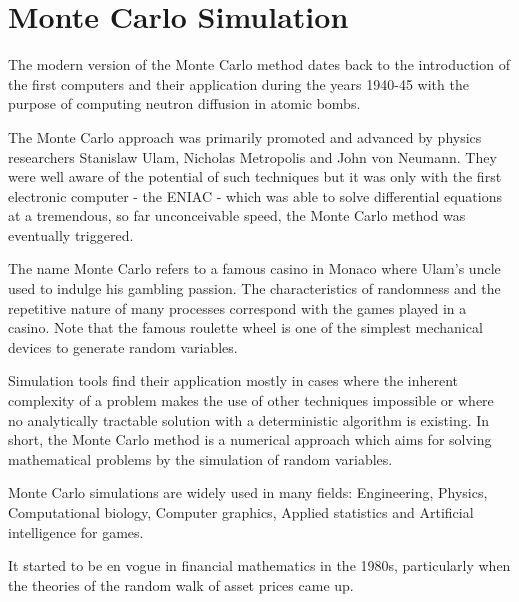 \chapter{Monte Carlo Simulation}\label{cap:montecarlo}

The modern version of the Monte Carlo method dates back to the
introduction of the first computers and their application during the
years 1940-45 with the purpose of computing neutron diffusion in atomic
bombs.

The Monte Carlo approach was primarily promoted and advanced by physics
researchers Stanislaw Ulam, Nicholas Metropolis and John von Neumann.
They were well aware of the potential of such techniques but it was only
with the first electronic computer - the ENIAC - which was able to solve
differential equations at a tremendous, so far unconceivable speed, the
Monte Carlo method was eventually triggered.

The name Monte Carlo refers to a famous casino in Monaco where Ulam's
uncle used to indulge his gambling passion. The characteristics of
randomness and the repetitive nature of many processes correspond with
the games played in a casino. Note that the famous roulette wheel is
one of the simplest mechanical devices to generate random variables.

Simulation tools find their application mostly in cases where the
inherent complexity of a problem makes the use of other techniques
impossible or where no analytically tractable solution with a
deterministic algorithm is existing. In short, the Monte Carlo method is
a numerical approach which aims for solving mathematical problems by the
simulation of random variables.

Monte Carlo simulations are widely used in many fields: Engineering,
Physics, Computational biology, Computer graphics, Applied statistics and 
Artificial intelligence for games.

It started to be en vogue in financial mathematics in the 1980s,
particularly when the theories of the random walk of asset prices came
up.




